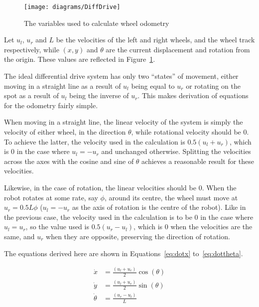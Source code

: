 \begin{figure}[!ht]
	\centering
	\texttt{[image: diagrams/DiffDrive]}
	\caption{The variables used to calculate wheel odometry}
	\label{fig:diff_drive_diagram}
\end{figure}

Let $u_l$, $u_r$ and $L$ be the velocities of the left and right wheels, and the
wheel track respectively, while $(x, y)$ and $\theta$ are the current displacement
and rotation from the origin. These values are reflected in Figure~\ref{fig:diff_drive_diagram}.

The ideal differential drive system has only two ``states'' of movement, either
moving in a straight line as a result of $u_l$ being equal to $u_r$ or rotating on
the spot as a result of $u_l$ being the inverse of $u_r$. This makes derivation of
equations for the odometry fairly simple.

When moving in a straight line, the linear velocity of the system is simply the
velocity of either wheel, in the direction $\theta$, while rotational velocity
should be $0$. To achieve the latter, the velocity used in the calculation is $0.5 (u_l + u_r)$, which is $0$ in the case where $u_l = -u_r$ and unchanged otherwise.
Splitting the velocities across the axes with the cosine and sine of $\theta$ achieves a reasonable result for these velocities.

Likewise, in the case of rotation, the linear velocities should be $0$. When the
robot rotates at some rate, say $\phi$, around its centre, the wheel must move at $u_r = 0.5 L \phi$ ($u_l = -u_r$ as the axis of rotation is the centre of the
robot). Like in the previous case, the velocity used in the calculation is to be 0
in the case where $u_l = u_r$, so the value
used is $0.5 (u_r - u_l)$, which is $0$ when the velocities are the same, and $u_r$ when they are opposite, preserving the direction of rotation.

The equations derived here are shown in Equations~\ref{eq:dotx} to~\ref{eq:dottheta}.


\begin{align}
\dot{x} & = \frac{(u_l + u_r)}{2} \cos(\theta) \label{eq:dotx} \\
\dot{y} & = \frac{(u_l + u_r)}{2} \sin(\theta) \label{eq:doty} \\
\dot{\theta} & = \frac{(u_r - u_l)}{L} \label{eq:dottheta}
\end{align}


